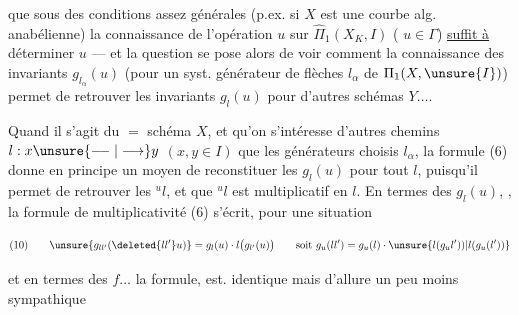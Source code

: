  que sous des conditions assez générales (p.ex. si $X$ est une courbe alg. anabélienne) la connaissance de l'opération $u$ sur $\widehat{\Pi}_1(X_K,I)$ ( $u\in\Gamma$) \uline{suffit à} déterminer $u$ --- et la question se pose alors de voir comment la connaissance des invariants $g_{l_\alpha}(u)$  (pour un syst. générateur de flèches $l_\alpha$ de $\Pi_1(X,\unsure{I})$) permet de retrouver les invariants $g_l(u)$ pour d'autres schémas $Y\ldots$.


Quand il s'agit du $=$ schéma $X$, et qu'on s'intéresse  d'autres chemins $l:x\unsure{\relbar\joinrel\relbar|\longrightarrow}y$ $(x,y\in I)$ que les générateurs choisis $l_\alpha$, la formule (6) donne en principe un moyen de reconstituer les $g_l(u)$ pour tout $l$, puisqu'il permet de retrouver les ${}^u l$, et que ${}^u l$ est multiplicatif en $l$. En termes des $g_l(u)$, , la formule de multiplicativité (6) s'écrit, pour une situation



\[
(10)\qquad \unsure{g_{ll'}(\deleted{ll'}u)}=g_l(u)\cdot l\bigl(g_{l'}(u)\bigr)
\qquad\text{soit }g_u(ll')=g_u(l)\cdot \unsure{l(g_u l'))|l(g_u(l'))}
\]



et en termes des $f\ldots$ la formule, est. identique mais d'allure un peu moins sympathique


